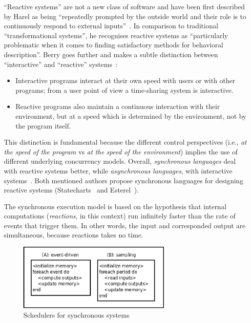 \documentclass{acm_proc_article-sp}
\newcommand{\CEU}{\textsc{C\'{e}u}\xspace}
\newcommand{\1}{\;}
\newcommand{\2}{\;\;}
\newcommand{\3}{\;\;\;}
\newcommand{\5}{\;\;\;\;\;}
\begin{document}
``Reactive systems'' are not a new class of software and have been first 
described by Harel as being ``repeatedly prompted by the outside world and 
their role is to continuously respond to external 
inputs''~\cite{statecharts.reactive}.
In comparison to traditional ``transformational systems'', he recognises 
reactive systems as ``particularly problematic when it comes to finding 
satisfactory methods for behavioral description''.
%
Berry goes further and makes a subtle distinction between ``interactive'' and 
``reactive'' systems~\cite{rp.synchronous}:
%
\begin{itemize}
\item Interactive programs interact at their own speed with users or with other 
programs; from a user point of view a time-sharing system is interactive.
\item Reactive programs also maintain a continuous interaction with their 
environment, but at a speed which is determined by the environment, not by the 
program itself.
\end{itemize}


This distinction is fundamental because the different control perspectives 
(i.e., \emph{at the speed of the program} vs \emph{at the speed of the 
environment}) implies the use of different underlying concurrency models.
%
Overall, \emph{synchronous languages} deal with reactive systems better, while 
\emph{asynchronous languages}, with interactive systems~\cite{esterel.crp}.
%
Both mentioned authors propose synchronous languages for designing reactive 
systems (Statecharts~\cite{statecharts.visual} and 
Esterel~\cite{esterel.ieee91}).


The synchronous execution model is based on the hypothesis that internal 
computations (\emph{reactions}, in this context) run infinitely faster than the 
rate of events that trigger them.
In other words, the input and corresponded output are simultaneous, because 
reactions takes no time.

\begin{figure}
\centering
\includegraphics[width=3.0in]{sync_impl.eps}
\caption{Schedulers for synchronous systems}
\label{fig.impl}
\end{figure}
\end{document}
